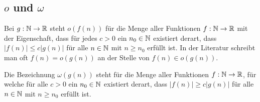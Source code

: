 \subsection{$o$ und $\omega$}

\begin{defn} 
Bei $g : \mathbb{N} \to \mathbb{R}$ steht $o(f(n))$ für die Menge aller Funktionen $f: \mathbb{N} \to \mathbb{R}$ mit der Eigenschaft, dass für jedes $c>0$ ein $n_0 \in \mathbb{N}$ existiert derart, dass $|f(n)| \le c |g(n)|$ für alle $n \in \mathbb{N}$ mit $n \ge n_0$ erfüllt ist. In der Literatur schreibt man oft $f(n) = o(g(n))$ an der Stelle von $f(n) \in o(g(n))$. 
\end{defn} 

\begin{defn}
Die Bezeichnung $\omega(g(n))$ steht für die Menge aller Funktionen $f : \mathbb{N} \to \mathbb{R}$, für welche für alle $c>0$ ein $n_0 \in \mathbb{N}$ existiert derart, dass $|f(n)| \ge c|g(n)|$ für alle $n \in \mathbb{N}$ mit $n \ge n_0$ erfüllt ist. 
\end{defn} 
